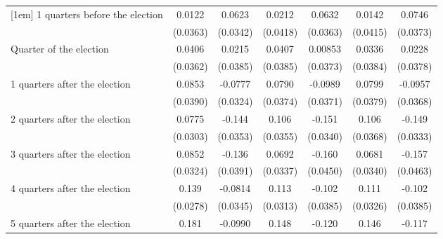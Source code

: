 \begin{table}[htbp]
\begin{tabular}{l*{6}{c}}
[1em]
 1 quarters before the election&      0.0122         &      0.0623         &      0.0212         &      0.0632         &      0.0142         &      0.0746\sym{*}  \\
                    &    (0.0363)         &    (0.0342)         &    (0.0418)         &    (0.0363)         &    (0.0415)         &    (0.0373)         \\
[1em]
Quarter of the election&      0.0406         &      0.0215         &      0.0407         &     0.00853         &      0.0336         &      0.0228         \\
                    &    (0.0362)         &    (0.0385)         &    (0.0385)         &    (0.0373)         &    (0.0384)         &    (0.0378)         \\
[1em]
 1 quarters after the election&      0.0853\sym{*}  &     -0.0777\sym{*}  &      0.0790\sym{*}  &     -0.0989\sym{**} &      0.0799\sym{*}  &     -0.0957\sym{**} \\
                    &    (0.0390)         &    (0.0324)         &    (0.0374)         &    (0.0371)         &    (0.0379)         &    (0.0368)         \\
[1em]
 2 quarters after the election&      0.0775\sym{*}  &      -0.144\sym{***}&       0.106\sym{**} &      -0.151\sym{***}&       0.106\sym{**} &      -0.149\sym{***}\\
                    &    (0.0303)         &    (0.0353)         &    (0.0355)         &    (0.0340)         &    (0.0368)         &    (0.0333)         \\
[1em]
 3 quarters after the election&      0.0852\sym{**} &      -0.136\sym{***}&      0.0692\sym{*}  &      -0.160\sym{***}&      0.0681\sym{*}  &      -0.157\sym{***}\\
                    &    (0.0324)         &    (0.0391)         &    (0.0337)         &    (0.0450)         &    (0.0340)         &    (0.0463)         \\
[1em]
 4 quarters after the election&       0.139\sym{***}&     -0.0814\sym{*}  &       0.113\sym{***}&      -0.102\sym{**} &       0.111\sym{***}&      -0.102\sym{**} \\
                    &    (0.0278)         &    (0.0345)         &    (0.0313)         &    (0.0385)         &    (0.0326)         &    (0.0385)         \\
[1em]
 5 quarters after the election&       0.181\sym{***}&     -0.0990\sym{**} &       0.148\sym{***}&      -0.120\sym{***}&       0.146\sym{***}&      -0.117\sym{***}\\

\end{tabular}
\end{table}
